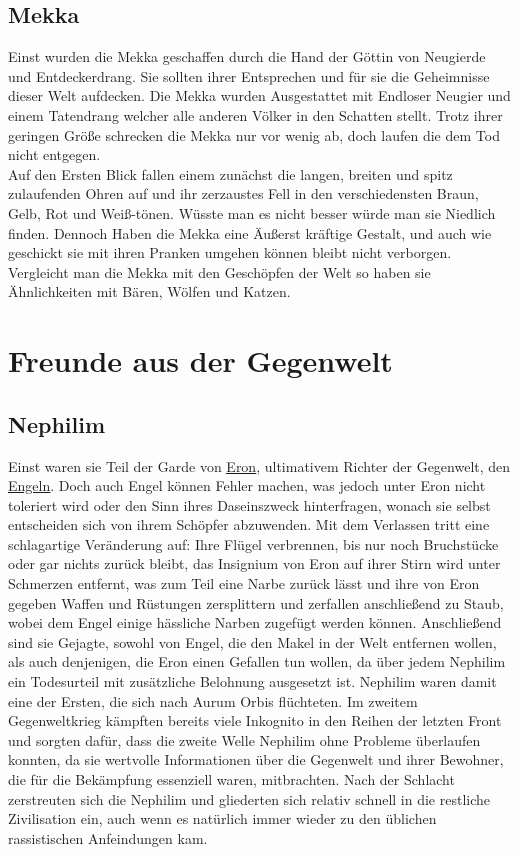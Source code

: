 \documentclass[a4paper,12pt,oneside]{book}
\begin{document}
\section{Mekka}\label{Mekka}
Einst wurden die Mekka geschaffen durch die Hand der Göttin von Neugierde und Entdeckerdrang. Sie sollten ihrer Entsprechen und für sie die Geheimnisse dieser Welt aufdecken. Die Mekka wurden Ausgestattet mit Endloser Neugier und einem Tatendrang welcher alle anderen Völker in den Schatten stellt. Trotz ihrer geringen Größe schrecken die Mekka nur vor wenig ab, doch laufen die dem Tod nicht entgegen. \\
Auf den Ersten Blick fallen einem zunächst die langen, breiten und spitz zulaufenden Ohren auf und ihr zerzaustes Fell in den verschiedensten Braun, Gelb, Rot und Weiß-tönen. Wüsste man es nicht besser würde man sie Niedlich finden. Dennoch Haben die Mekka eine Äußerst kräftige Gestalt, und auch wie geschickt sie mit ihren Pranken umgehen können bleibt nicht verborgen. Vergleicht man die Mekka mit den Geschöpfen der Welt so haben sie Ähnlichkeiten mit Bären, Wölfen und Katzen.

\chapter{Freunde aus der Gegenwelt}

\section{Nephilim}\label{Nephilim}
Einst waren sie Teil der Garde von \uline{\hyperref[Eron]{Eron}}, ultimativem Richter der Gegenwelt, den \uline{\hyperref[Engel]{Engeln}}. Doch auch Engel können Fehler machen, was jedoch unter Eron nicht toleriert wird oder den Sinn ihres Daseinszweck hinterfragen, wonach sie selbst entscheiden sich von ihrem Schöpfer abzuwenden. Mit dem Verlassen tritt eine schlagartige Veränderung auf: Ihre Flügel verbrennen, bis nur noch Bruchstücke oder gar nichts zurück bleibt, das Insignium von Eron auf ihrer Stirn wird unter Schmerzen entfernt, was zum Teil eine Narbe zurück lässt und ihre von Eron gegeben Waffen und Rüstungen zersplittern und zerfallen anschließend zu Staub, wobei dem Engel einige hässliche Narben zugefügt werden können. Anschließend sind sie Gejagte, sowohl von Engel, die den Makel in der Welt entfernen wollen, als auch denjenigen, die Eron einen Gefallen tun wollen, da über jedem Nephilim ein Todesurteil mit zusätzliche Belohnung ausgesetzt ist. Nephilim waren damit eine der Ersten, die sich nach Aurum Orbis flüchteten. Im zweitem Gegenweltkrieg kämpften bereits viele Inkognito in den Reihen der letzten Front und sorgten dafür, dass die zweite Welle Nephilim ohne Probleme überlaufen konnten, da sie wertvolle Informationen über die Gegenwelt und ihrer Bewohner, die für die Bekämpfung essenziell waren, mitbrachten. Nach der Schlacht zerstreuten sich die Nephilim und gliederten sich relativ schnell in die restliche Zivilisation ein, auch wenn es natürlich immer wieder zu den üblichen rassistischen Anfeindungen kam.
\end{document}
